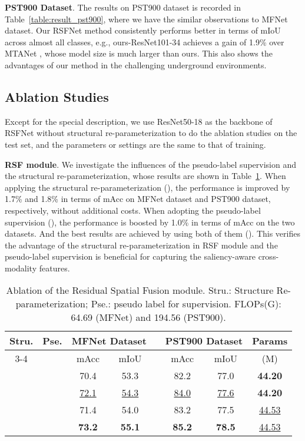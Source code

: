 \documentclass[10.5pt,twocolumn,journal,letterpaper]{IEEEtran}
\newcommand{\eg}{e.g.}
\begin{document}
\textbf{PST900 Dataset}. The results on PST900 dataset is recorded in Table~\ref{table:result_pst900}, where we have the similar observations to MFNet dataset. Our RSFNet method consistently performs better in terms of mIoU across almost all classes, \eg, ours-ResNet101-34 achieves a gain of 1.9\% over MTANet \cite{zhou-tiv2022-mtanet}, whose model size is much larger than ours. This also shows the advantages of our method in the challenging underground environments.

\subsection{Ablation Studies}
Except for the special description, we use ResNet50-18 as the backbone of RSFNet without structural re-parameterization to do the ablation studies on the test set, and the parameters or settings are the same to that of training.

\textbf{RSF module}. We investigate the influences of the pseudo-label supervision and the structural re-parameterization, whose results are shown in Table~\ref{table:abl_rsfnet}. When applying the structural re-parameterization (), the performance is improved by 1.7\% and 1.8\% in terms of mAcc on MFNet dataset and PST900 dataset, respectively, without additional costs. When adopting the pseudo-label supervision (), the performance is boosted by 1.0\% in terms of mAcc on the two datasets. And the best results are achieved by using both of them (). This verifies the advantage of the structural re-parameterization in RSF module and the pseudo-label supervision is beneficial for capturing the saliency-aware cross-modality features. 

\begin{table}[!t]
	\centering
	\caption{Ablation of the Residual Spatial Fusion module. Stru.: Structure Re-parameterization; Pse.: pseudo label for supervision. FLOPs(G): 64.69 (MFNet) and 194.56 (PST900).}
	\label{table:abl_rsfnet}
\begin{tabular}{c c c c  c c  c c}
		\toprule[0.75pt]
		\multirow{2}{*}{Stru.} & \multirow{2}{*}{Pse.} & \multicolumn{2}{c}{MFNet Dataset} & &
		\multicolumn{2}{c}{PST900 Dataset} & \multirow{2}{*}{Params} \\
		\cmidrule[0.5pt]{3-4} \cmidrule[0.5pt]{6-7}
		& & mAcc & mIoU  & & mAcc & mIoU  &(M)  \\
		
		\midrule[0.5pt]
		\rowcolor{maroon}& & 70.4 & 53.3  & & 82.2 & 77.0  & \textbf{44.20} \\
		
		\checkmark & & \underline{72.1} & \underline{54.3} && \underline{84.0} & \underline{77.6}  & \textbf{44.20} \\
		
		\rowcolor{maroon}& \checkmark & 71.4 & 54.0  && 83.2 & 77.5 & \underline{44.53} \\
		
		\checkmark & \checkmark & \textbf{73.2} & \textbf{55.1}  && \textbf{85.2} & \textbf{78.5}  & \underline{44.53} \\			
		\toprule[0.75pt]
	\end{tabular}
\end{table}
\end{document}
